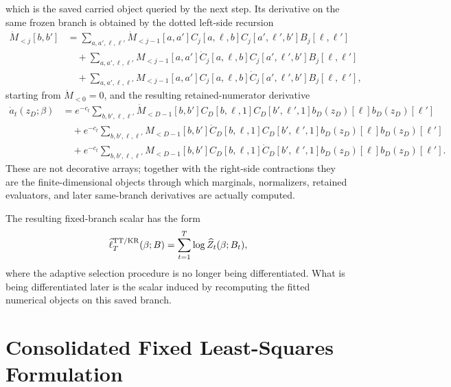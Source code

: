 which is the saved carried object queried by the next step.  Its derivative on
the same frozen branch is obtained by the dotted left-side recursion
\begin{equation}
\begin{aligned}
  \dot M_{<j}[b,b']
  &=
  \sum_{a,a',\ell,\ell'}
  \dot M_{<j-1}[a,a']
  C_j[a,\ell,b]
  C_j[a',\ell',b']
  B_j[\ell,\ell']\\
  &\quad+
  \sum_{a,a',\ell,\ell'}
  M_{<j-1}[a,a']
  \dot C_j[a,\ell,b]
  C_j[a',\ell',b']
  B_j[\ell,\ell']\\
  &\quad+
  \sum_{a,a',\ell,\ell'}
  M_{<j-1}[a,a']
  C_j[a,\ell,b]
  \dot C_j[a',\ell',b']
  B_j[\ell,\ell'],
  \label{eq:bf-hd-squared-tt-dot-left-mass-recursion}
\end{aligned}
\end{equation}
starting from $\dot M_{<0}=0$, and the resulting retained-numerator derivative
\begin{equation}
\begin{aligned}
  \dot a_t(z_D;\beta)
  &=
  e^{-c_t}
  \sum_{b,b',\ell,\ell'}
  \dot M_{<D-1}[b,b']
  C_D[b,\ell,1]
  C_D[b',\ell',1]
  b_D(z_D)[\ell]
  b_D(z_D)[\ell']\\
  &\quad+
  e^{-c_t}
  \sum_{b,b',\ell,\ell'}
  M_{<D-1}[b,b']
  \dot C_D[b,\ell,1]
  C_D[b',\ell',1]
  b_D(z_D)[\ell]
  b_D(z_D)[\ell']\\
  &\quad+
  e^{-c_t}
  \sum_{b,b',\ell,\ell'}
  M_{<D-1}[b,b']
  C_D[b,\ell,1]
  \dot C_D[b',\ell',1]
  b_D(z_D)[\ell]
  b_D(z_D)[\ell'].
  \label{eq:bf-hd-squared-tt-dot-retained-numerator}
\end{aligned}
\end{equation}
These are not decorative arrays; together with the right-side contractions they
are the finite-dimensional objects through which marginals, normalizers,
retained evaluators, and later same-branch derivatives are actually computed.

The resulting fixed-branch scalar has the form
\begin{equation}
  \widehat\ell_T^{\rm TT/KR}(\beta;B)
  =\sum_{t=1}^T \log \widehat Z_t(\beta;B_t),
  \label{eq:bf-hd-squared-tt-scalar}
\end{equation}
where the adaptive selection procedure is no longer being differentiated.  What
is being differentiated later is the scalar induced by recomputing the fitted
numerical objects on this saved branch.

\section{Consolidated Fixed Least-Squares Formulation}
\label{sec:bf-hd-squared-tt-fixed-ls}

